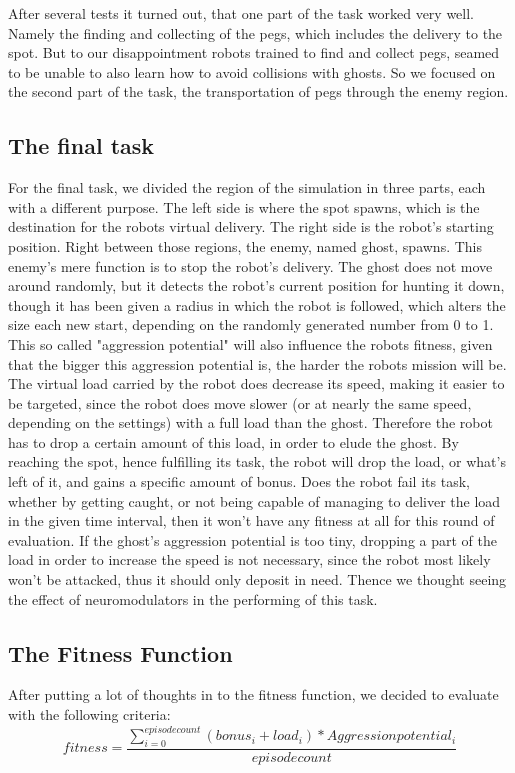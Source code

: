 \documentclass[12pt,fleqn,a4paper]{article}
\begin{document}
After several tests it turned out, that one part of the task worked very well. Namely the finding and collecting of the pegs, which includes the delivery to the spot. But to our disappointment robots trained to find and collect pegs, seamed to be unable to also learn how to avoid collisions with ghosts. So we focused on the second part of the task, the transportation of pegs through the enemy region.

\subsection{The final task}
For the final task, we divided the region of the simulation in three parts, each with a different purpose. The left side is where the spot spawns, which is the destination for the robots virtual delivery. The right side is the robot's
starting position. Right between those regions, the enemy, named ghost, spawns. This enemy's mere function is to stop the robot's delivery. The ghost does not move around randomly, but it detects the robot's current position for hunting it down, though it has been given a radius in which the robot is followed, which alters the size each new start, depending on the randomly generated number from 0 to 1. This so called "aggression potential" will also influence the robots fitness, given that the bigger this aggression potential is, the harder the robots mission will be. The virtual load carried by the robot does decrease its speed, making it easier to be targeted, since the robot does move slower (or at nearly the same speed, depending on the settings) with a full load than the ghost. Therefore the robot has to drop a certain amount of this load, in order to elude the ghost. By reaching the spot, hence fulfilling its task, the robot will drop the load, or what's left of it, and gains a specific amount of bonus. Does the robot fail its task, whether by getting caught, or not being capable of managing to deliver the load in the given time interval, then it won't have any fitness at all for this round of evaluation. If the ghost's aggression potential is too tiny, dropping a part of the load in order to increase the speed is not necessary, since the robot most likely won't be attacked, thus it should only deposit in need. Thence we thought seeing the effect of neuromodulators in the performing of this task.


\subsection{The Fitness Function}
After putting a lot of thoughts in to the fitness function, we decided to evaluate with the following criteria:
\[ fitness = \frac{\sum_{i=0}^{episodecount} (bonus_i + load_i)*Aggressionpotential_i}{episodecount} \]
\end{document}
